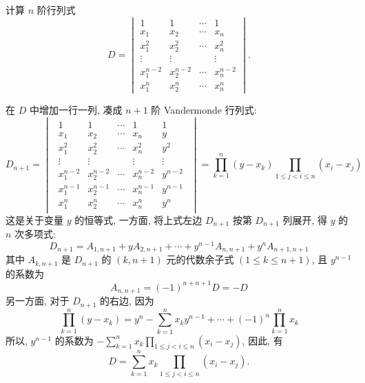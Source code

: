 \begin{example}[2006 山东大学]
    计算 $n$ 阶行列式\label{fmty}
    $$D=\begin{vmatrix}
            1         & 1         & \cdots & 1         \\
            x_1       & x_2       & \cdots & x_n       \\
            x_1^2     & x_2^2     & \cdots & x_n^2     \\
            \vdots    & \vdots    &        & \vdots    \\
            x_1^{n-2} & x_2^{n-2} & \cdots & x_n^{n-2} \\
            x_1^n     & x_2^n     & \cdots & x_n^n
        \end{vmatrix}.$$
\end{example}
\begin{solution}
    在 $D$ 中增加一行一列, 凑成 $n+1$ 阶 Vandermonde 行列式:
    $$D_{n+1}=\begin{vmatrix}
            \begin{array}{cccc|c|}
                1         & 1         & \cdots & 1         & 1       \\
                x_1       & x_2       & \cdots & x_n       & y       \\
                x_1^2     & x_2^2     & \cdots & x_n^2     & y^2     \\
                \vdots    & \vdots    &        & \vdots    & \vdots  \\
                x_1^{n-2} & x_2^{n-2} & \cdots & x_n^{n-2} & y^{n-2} \\ \hline
                x_1^{n-1} & x_2^{n-1} & \cdots & x_n^{n-1} & y^{n-1} \\ \hline
                x_1^n     & x_2^n     & \cdots & x_n^n     & y^n
            \end{array}
        \end{vmatrix}=\prod_{k=1}^{n}(y-x_k)\prod_{1\leqslant j<i\leqslant n}(x_i-x_j)$$
        这是关于变量 $y$ 的恒等式, 一方面, 将上式左边 $D_{n+1}$ 按第 $D_{n+1}$ 列展开, 得 $y$ 的 $n$ 次多项式:
        $$D_{n+1}=A_{1,n+1}+yA_{2,n+1}+\cdots+y^{n-1}A_{n,n+1}+y^nA_{n+1,n+1}$$
        其中 $A_{k,n+1}$ 是 $D_{n+1}$ 的 $(k,n+1)$ 元的代数余子式 $(1\leqslant k\leqslant n+1)$, 且 $y^{n-1}$ 的系数为
        $$A_{n,n+1}=(-1)^{n+n+1}D=-D$$
        另一方面, 对于 $D_{n+1}$ 的右边, 因为 $$\prod_{k=1}^{n}(y-x_k)=y^n-\sum_{k=1}^{n}x_ky^{n-1}+\cdots+(-1)^n\prod_{k=1}^{n}x_k$$
        所以, $y^{n-1}$ 的系数为 $\displaystyle-\sum_{k=1}^{n}x_k\prod_{1\leqslant j<i\leqslant n}(x_i-x_j)$, 因此, 有
        $$D=\sum_{k=1}^{n}x_k\prod_{1\leqslant j<i\leqslant n}(x_i-x_j).$$
\end{solution}

